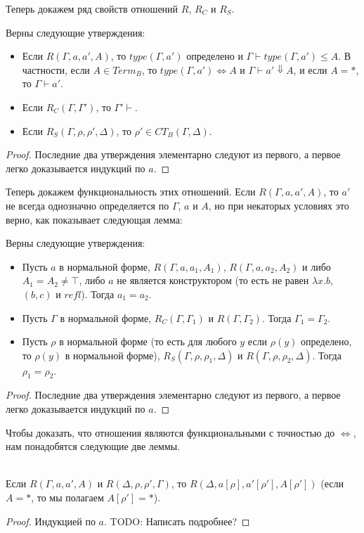 \documentclass{amsart}
\theoremstyle{definition}
\theoremstyle{remark}
\newcommand{\deq}{\Leftrightarrow}
\numberwithin{figure}{section}
\begin{document}
Теперь докажем ряд свойств отношений $R$, $R_C$ и $R_S$.
\begin{lem}
Верны следующие утверждения:
\begin{itemize}
\item Если $R(\Gamma, a, a', A)$, то $type(\Gamma, a')$ определено и $\Gamma \vdash type(\Gamma, a') \leq A$.
    В частности, если $A \in Term_B$, то $type(\Gamma, a') \deq A$ и $\Gamma \vdash a' \Downarrow A$,
    и если $A = *$, то $\Gamma \vdash a'$.
\item Если $R_C(\Gamma, \Gamma')$, то $\Gamma' \vdash$.
\item Если $R_S(\Gamma, \rho, \rho', \Delta)$, то $\rho' \in CT_B(\Gamma, \Delta)$.
\end{itemize}
\end{lem}
\begin{proof}
Последние два утверждения элементарно следуют из первого, а первое легко доказывается индукций по $a$.
\end{proof}

Теперь докажем функциональность этих отношений.
Если $R(\Gamma, a, a', A)$, то $a'$ не всегда однозначно определяется по $\Gamma$, $a$ и $A$, но при некаторых условиях это верно, как показывает следующая лемма:
\begin{lem}
Верны следующие утверждения:
\begin{itemize}
\item Пусть $a$ в нормальной форме, $R(\Gamma, a, a_1, A_1)$, $R(\Gamma, a, a_2, A_2)$ и либо $A_1 = A_2 \neq \top$, либо $a$ не является конструктором (то есть не равен $\lambda x. b$, $(b, c)$ и $refl$). Тогда $a_1 = a_2$.
\item Пусть $\Gamma$ в нормальной форме, $R_C(\Gamma, \Gamma_1)$ и $R(\Gamma, \Gamma_2)$. Тогда $\Gamma_1 = \Gamma_2$.
\item Пусть $\rho$ в нормальной форме (то есть для любого $y$ если $\rho(y)$ определено, то $\rho(y)$ в нормальной форме), $R_S(\Gamma, \rho, \rho_1, \Delta)$ и $R(\Gamma, \rho, \rho_2, \Delta)$. Тогда $\rho_1 = \rho_2$.
\end{itemize}
\end{lem}
\begin{proof}
Последние два утверждения элементарно следуют из первого, а первое легко доказывается индукций по $a$.
\end{proof}

Чтобы доказать, что отношения являются функциональными с точностью до $\deq$, нам понадобятся следующие две леммы.
\begin{lem} \ \\
Если $R(\Gamma, a, a', A)$ и $R(\Delta, \rho, \rho', \Gamma)$, то $R(\Delta, a[\rho], a'[\rho'], A[\rho'])$ (если $A = *$, то мы полагаем $A[\rho'] = *$).
\end{lem}
\begin{proof}
Индукцией по $a$. TODO: Написать подробнее?
\end{proof}
\end{document}
